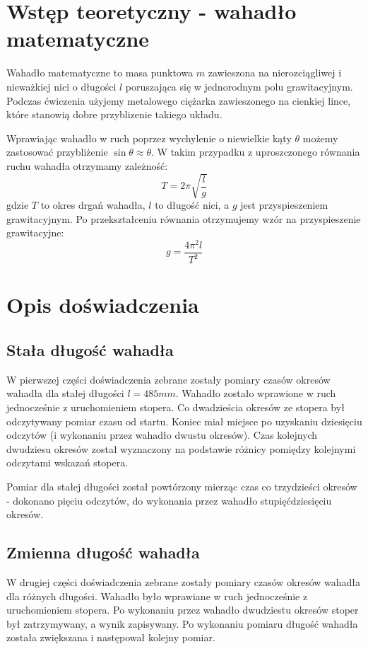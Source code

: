 \documentclass[a4paper,10pt,twoside]{article}
\begin{document}
\section{Wstęp teoretyczny - wahadło matematyczne}

Wahadło matematyczne to masa punktowa $m$ zawieszona na nierozciągliwej i nieważkiej nici o długości $l$ poruszająca się w jednorodnym polu grawitacyjnym. Podczas ćwiczenia użyjemy metalowego ciężarka zawieszonego na cienkiej lince, które stanowią dobre przyblizenie takiego układu.

Wprawiając wahadło w ruch poprzez wychylenie o niewielkie kąty $\theta$ możemy zastosować przybliżenie $\sin\theta\approx\theta$. W takim przypadku z uproszczonego równania ruchu wahadła otrzymamy zależność: $$T = 2\pi\sqrt{\frac{l}{g}}$$gdzie $T$ to okres drgań wahadła, $l$ to długość nici, a $g$ jest przyspieszeniem grawitacyjnym. Po przekształceniu równania otrzymujemy wzór na przyspieszenie grawitacyjne: $$g = \frac{4\pi^2l}{T^2}$$

\section{Opis doświadczenia}

\subsection{Stała długość wahadła}

W pierwszej części doświadczenia zebrane zostały pomiary czasów okresów wahadła dla stałej długości $l = 485 \unit{mm}$. Wahadło zostało wprawione w ruch jednocześnie z uruchomieniem stopera. Co dwadzieścia okresów ze stopera był odczytywany pomiar czasu od startu. Koniec miał miejsce po uzyskaniu dziesięciu odczytów (i wykonaniu przez wahadło dwustu okresów). Czas kolejnych dwudziesu okresów został wyznaczony na podstawie różnicy pomiędzy kolejnymi odczytami wskazań stopera.

Pomiar dla stałej długości został powtórzony mierząc czas co trzydzieści okresów - dokonano pięciu odczytów, do wykonania przez wahadło stupięćdziesięciu okresów.

\subsection{Zmienna długość wahadła}

W drugiej części doświadczenia zebrane zostały pomiary czasów okresów wahadła dla różnych długości. Wahadło było wprawiane w ruch jednocześnie z uruchomieniem stopera. Po wykonaniu przez wahadło dwudziestu okresów stoper był zatrzymywany, a wynik zapisywany. Po wykonaniu pomiaru długość wahadła została zwiększana i następował kolejny pomiar.
\end{document}

